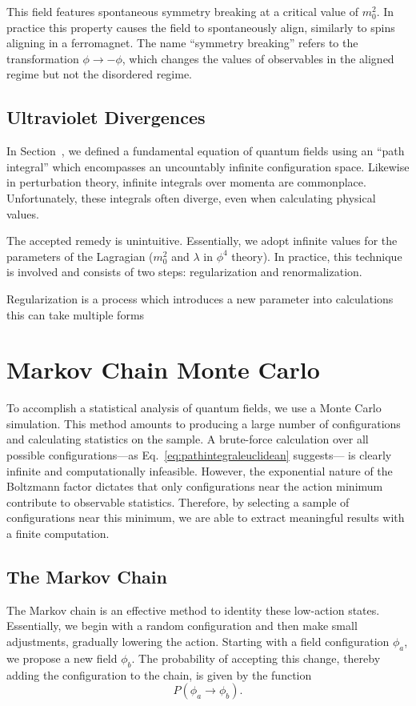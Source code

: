 \documentclass[12pt]{report}
\begin{document}
This field features spontaneous symmetry breaking at a critical value of $m_0^2$. In practice this property causes the field to spontaneously align, similarly to spins aligning in a ferromagnet. The name ``symmetry breaking'' refers to the transformation $\phi\rightarrow-\phi$, which changes the values of observables in the aligned regime but not the disordered regime.

\subsection{Ultraviolet Divergences}

In Section~,  we defined a fundamental equation of quantum fields using an ``path integral'' which encompasses an uncountably infinite configuration space.  Likewise in perturbation theory, infinite integrals over momenta are commonplace. Unfortunately, these integrals often diverge, even when calculating physical values.

The accepted remedy is unintuitive. Essentially, we adopt infinite values for the parameters of the Lagragian ($m_0^2$ and $\lambda$ in $\phi^4$ theory). In practice, this technique is involved and consists of two steps: regularization and renormalization.

Regularization is a process which introduces a new parameter into calculations this can take multiple forms 

\section{Markov Chain Monte Carlo}

To accomplish a statistical analysis of quantum fields, we use a Monte Carlo simulation. This method amounts to producing a large number of configurations and calculating statistics on the sample. A brute-force calculation over all possible configurations---as Eq.~\ref{eq:pathintegraleuclidean} suggests--- is clearly infinite and computationally infeasible. However, the exponential nature of the Boltzmann factor dictates that only configurations near the action minimum contribute to observable statistics. Therefore, by selecting a sample of configurations near this minimum, we are able to extract meaningful results with a finite computation.

\subsection{The Markov Chain}
The Markov chain is an effective method to identity these low-action states. Essentially, we begin with a random configuration and then make small adjustments, gradually lowering the action. Starting with a field configuration $\phi_a$, we propose a new field $\phi_b$. The probability of accepting this change, thereby adding the configuration to the chain, is given by the function 
\[P(\phi_a \rightarrow \phi_b).\]
\end{document}
